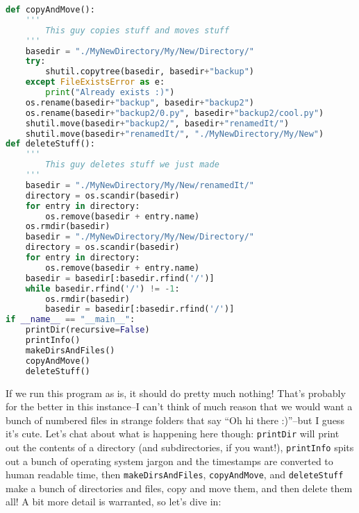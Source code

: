 \documentclass[11pt, twoside, reqno]{book}
\begin{document}
\begin{lstlisting}[language=Python]
def copyAndMove():
    '''
        This guy copies stuff and moves stuff
    '''
    basedir = "./MyNewDirectory/My/New/Directory/"
    try:
        shutil.copytree(basedir, basedir+"backup")
    except FileExistsError as e:
        print("Already exists :)")
    os.rename(basedir+"backup", basedir+"backup2")
    os.rename(basedir+"backup2/0.py", basedir+"backup2/cool.py")
    shutil.move(basedir+"backup2/", basedir+"renamedIt/")
    shutil.move(basedir+"renamedIt/", "./MyNewDirectory/My/New")
def deleteStuff():
    '''
        This guy deletes stuff we just made
    '''
    basedir = "./MyNewDirectory/My/New/renamedIt/"
    directory = os.scandir(basedir)
    for entry in directory:
        os.remove(basedir + entry.name)
    os.rmdir(basedir)
    basedir = "./MyNewDirectory/My/New/Directory/"
    directory = os.scandir(basedir)
    for entry in directory:
        os.remove(basedir + entry.name)
    basedir = basedir[:basedir.rfind('/')]
    while basedir.rfind('/') != -1:
        os.rmdir(basedir)
        basedir = basedir[:basedir.rfind('/')]
if __name__ == "__main__":
    printDir(recursive=False)
    printInfo()
    makeDirsAndFiles()
    copyAndMove()
    deleteStuff()
\end{lstlisting}

If we run this program as is, it should do pretty much nothing! That's probably for the better in this instance--I can't think of much reason that we would want a bunch of numbered files in strange folders that say ``Oh hi there :)''--but I guess it's cute. Let's chat about what is happening here though: \texttt{printDir} will print out the contents of a directory (and subdirectories, if you want!), \texttt{printInfo} spits out a bunch of operating system jargon and the timestamps are converted to human readable time, then \texttt{makeDirsAndFiles}, \texttt{copyAndMove}, and \texttt{deleteStuff} make a bunch of directories and files, copy and move them, and then delete them all! A bit more detail is warranted, so let's dive in:
\end{document}
